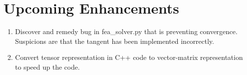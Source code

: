 \section{Upcoming Enhancements}

\begin{enumerate}
\item Discover and remedy bug in fea\_solver.py that is preventing convergence. Suspicions are that the tangent has been implemented incorrectly.
\item Convert tensor representation in C++ code to vector-matrix representation to speed up the code.
\end{enumerate}

